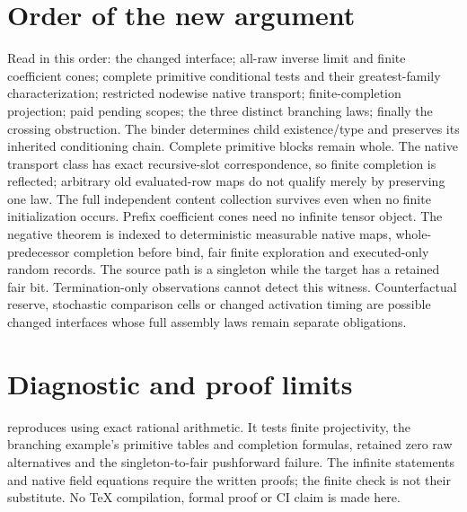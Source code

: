 \documentclass{article}
\begin{document}
\section{Order of the new argument}
Read  in this order: the changed interface; all-raw inverse limit and finite coefficient cones; complete primitive conditional tests and their greatest-family characterization; restricted nodewise native transport; finite-completion projection; paid pending scopes; the three distinct branching laws; finally the crossing obstruction.
The binder determines child existence/type and preserves its inherited conditioning chain. Complete primitive blocks remain whole. The native transport class has exact recursive-slot correspondence, so finite completion is reflected; arbitrary old evaluated-row maps do not qualify merely by preserving one law. The full independent content collection survives even when no finite initialization occurs. Prefix coefficient cones need no infinite tensor object.
The negative theorem is indexed to deterministic measurable native maps, whole-predecessor completion before bind, fair finite exploration and executed-only random records. The source path is a singleton while the target has a retained fair bit. Termination-only observations cannot detect this witness. Counterfactual reserve, stochastic comparison cells or changed activation timing are possible changed interfaces whose full assembly laws remain separate obligations.
\section{Diagnostic and proof limits}
 reproduces  using exact rational arithmetic. It tests finite projectivity, the branching example's primitive tables and completion formulas, retained zero raw alternatives and the singleton-to-fair pushforward failure. The infinite statements and native field equations require the written proofs; the finite check is not their substitute. No TeX compilation, formal proof or CI claim is made here.
\end{document}
